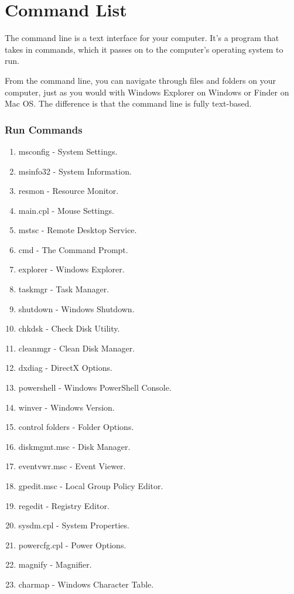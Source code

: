 \documentclass[11pt,a4paper,twoside]{article}
\begin{document}
\part{Command List}
The command line is a text interface for your computer. It’s a program that takes in commands, which it passes on to the computer’s operating system to run.\par
From the command line, you can navigate through files and folders on your computer, just as you would with Windows Explorer on Windows or Finder on Mac OS. The difference is that the command line is fully text-based.
\section{Run Commands}
\begin{enumerate}
    \item msconfig 	-	 System Settings.
\item msinfo32 	-	 System Information.
\item resmon 	-	 Resource Monitor.
\item main.cpl 	-	 Mouse Settings.
\item mstsc 	-	 Remote Desktop Service.
\item cmd 	-	 The Command Prompt.
\item explorer 	-	 Windows Explorer.
\item taskmgr 	-	 Task Manager.
\item shutdown 	-	 Windows Shutdown.
\item chkdsk 	-	 Check Disk Utility.
\item cleanmgr 	-	 Clean Disk Manager.
\item dxdiag 	-	 DirectX Options.
\item powershell 	-	 Windows PowerShell Console.
\item winver 	-	 Windows Version.
\item control folders 	-	 Folder Options.
\item diskmgmt.msc 	-	 Disk Manager.
\item eventvwr.msc 	-	 Event Viewer.
\item gpedit.msc 	-	 Local Group Policy Editor.
\item regedit 	-	 Registry Editor.
\item sysdm.cpl 	-	 System Properties.
\item powercfg.cpl 	-	 Power Options.
\item magnify 	-	 Magnifier.
\item charmap 	-	 Windows Character Table.

\end{enumerate}
\end{document}
